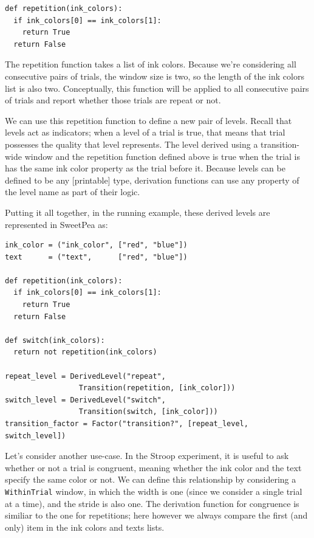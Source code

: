 \begin{verbatim}
def repetition(ink_colors):
  if ink_colors[0] == ink_colors[1]:
    return True
  return False
\end{verbatim}

The repetition function takes a list of ink colors. Because we're considering all consecutive pairs of trials, the window size is two, so the length of the ink colors list is also two. Conceptually, this function will be applied to all consecutive pairs of trials and report whether those trials are repeat or not.

We can use this repetition function to define a new pair of levels. Recall that levels act as indicators; when a level of a trial is true, that means that trial possesses the quality that level represents. The level derived using a transition-wide window and the repetition function defined above is true when the trial is has the same ink color property as the trial before it. Because levels can be defined to be any [printable] type, derivation functions can use any property of the level name as part of their logic.

Putting it all together, in the running example, these derived levels are represented in SweetPea as:

\begin{verbatim}
ink_color = ("ink_color", ["red", "blue"])
text      = ("text",      ["red", "blue"])

def repetition(ink_colors):
  if ink_colors[0] == ink_colors[1]:
    return True
  return False

def switch(ink_colors):
  return not repetition(ink_colors)

repeat_level = DerivedLevel("repeat",
                 Transition(repetition, [ink_color]))
switch_level = DerivedLevel("switch",
                 Transition(switch, [ink_color]))
transition_factor = Factor("transition?", [repeat_level, switch_level])

\end{verbatim}

Let's consider another use-case. In the Stroop experiment, it is useful to ask whether or not a trial is congruent, meaning whether the ink color and the text specify the same color or not. We can define this relationship by considering a \texttt{WithinTrial} window, in which the width is one (since we consider a single trial at a time), and the stride is also one. The derivation function for congruence is similiar to the one for repetitions; here however we always compare the first (and only) item in the ink colors and texts lists.

